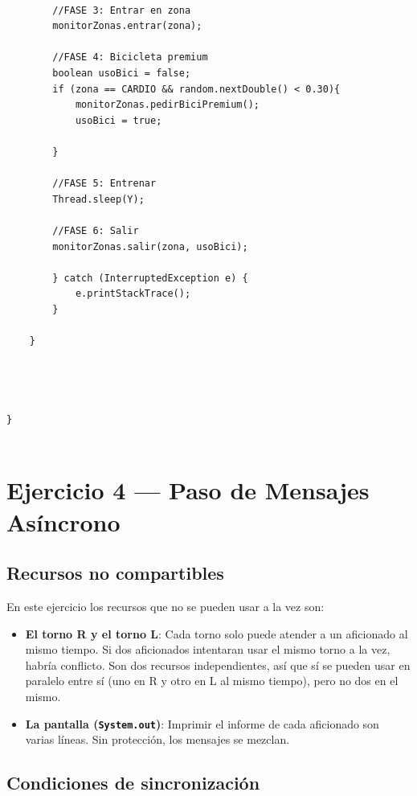 \documentclass[12pt,a4paper]{article}
\begin{document}
\begin{lstlisting}[language={}, caption={HiloCliente.java}]
		
	    //FASE 3: Entrar en zona
	    monitorZonas.entrar(zona);
	    
	    //FASE 4: Bicicleta premium
	    boolean usoBici = false;
	    if (zona == CARDIO && random.nextDouble() < 0.30){
	    	monitorZonas.pedirBiciPremium();
	    	usoBici = true;
	    	
	    }
	    
	    //FASE 5: Entrenar
	    Thread.sleep(Y);
	    
	    //FASE 6: Salir
	    monitorZonas.salir(zona, usoBici);
	    
		} catch (InterruptedException e) {
            e.printStackTrace();
        }
	    
	}
	
	
	
	
}


\end{lstlisting}

\newpage

\section{Ejercicio 4 — Paso de Mensajes Asíncrono}

\subsection{Recursos no compartibles}

En este ejercicio los recursos que no se pueden usar a la vez son:
\begin{itemize}
  \item \textbf{El torno R y el torno L}: Cada torno solo puede atender a un aficionado al mismo tiempo. Si dos aficionados intentaran usar el mismo torno a la vez, habría conflicto. Son dos recursos independientes, así que sí se pueden usar en paralelo entre sí (uno en R y otro en L al mismo tiempo), pero no dos en el mismo.
  \item \textbf{La pantalla (\texttt{System.out})}: Imprimir el informe de cada aficionado son varias líneas. Sin protección, los mensajes se mezclan.
\end{itemize}

\subsection{Condiciones de sincronización}
\end{document}
